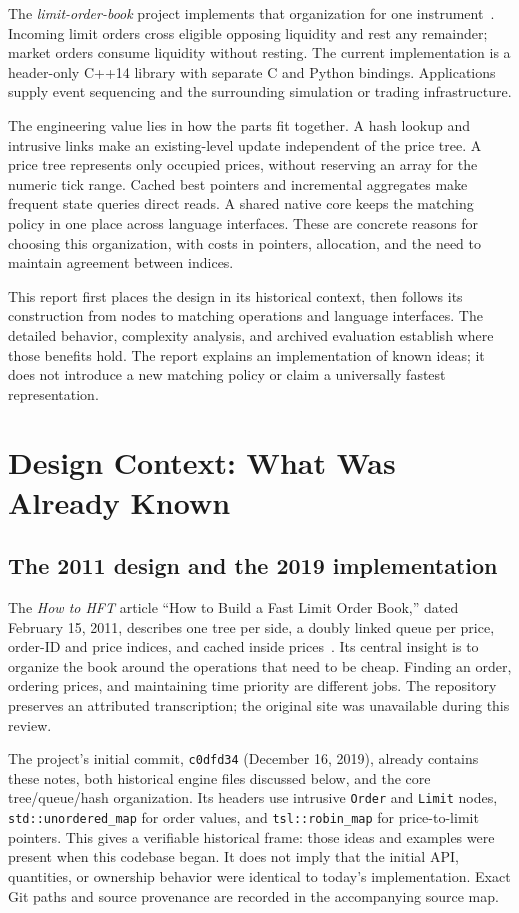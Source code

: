 \documentclass[10pt,letterpaper,twocolumn]{article}
\newcommand{\code}[1]{\texttt{#1}}
\begin{document}
The \emph{limit-order-book} project implements that organization for one
instrument~\cite{kauten-limit-order-book-2019}. Incoming limit orders cross
eligible opposing liquidity and rest any remainder; market orders consume
liquidity without resting. The current implementation is a header-only C++14
library with separate C and Python bindings. Applications supply event
sequencing and the surrounding simulation or trading infrastructure.

The engineering value lies in how the parts fit together. A hash lookup and
intrusive links make an existing-level update independent of the price tree.
A price tree represents only occupied prices, without reserving an array for
the numeric tick range. Cached best pointers and incremental aggregates make
frequent state queries direct reads. A shared native core keeps the matching
policy in one place across language interfaces. These are concrete reasons
for choosing this organization, with costs in pointers, allocation, and the
need to maintain agreement between indices.

This report first places the design in its historical context, then follows
its construction from nodes to matching operations and language interfaces.
The detailed behavior, complexity analysis, and archived evaluation establish
where those benefits hold. The report explains an implementation of known
ideas; it does not introduce a new matching policy or claim a universally
fastest representation.

\section{Design Context: What Was Already Known}
\subsection{The 2011 design and the 2019 implementation}
The \emph{How to HFT} article ``How to Build a Fast Limit Order Book,'' dated
February 15, 2011, describes one tree per side, a doubly linked queue per
price, order-ID and price indices, and cached inside prices~\cite{howtohft}.
Its central insight is to organize the book around the operations that need
to be cheap. Finding an order, ordering prices, and maintaining time priority
are different jobs. The repository preserves an attributed transcription;
the original site was unavailable during this review.

The project's initial commit, \code{c0dfd34} (December 16, 2019), already
contains these notes, both historical engine files discussed below, and the
core tree/queue/hash organization. Its headers use intrusive \code{Order} and
\code{Limit} nodes, \code{std::unordered\_map} for order values, and
\code{tsl::robin\_map} for price-to-limit pointers. This gives a verifiable
historical frame: those ideas and examples were present when this codebase
began. It does not imply that the initial API, quantities, or ownership
behavior were identical to today's implementation. Exact Git paths and
source provenance are recorded in the accompanying source map.
\end{document}
